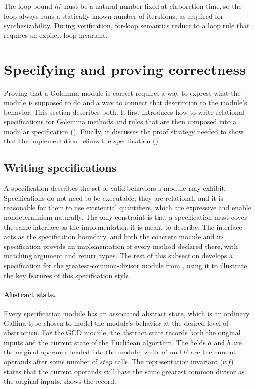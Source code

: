 \documentclass[fontset=fira-newtxsf]{mitthesis}
\theoremstyle{definition}
\theoremstyle{plain}
\begin{document}
The loop bound $\mathit{hi}$ must be a natural number fixed at elaboration time, so the loop always runs a statically known number of iterations, as required for synthesizability. During verification, for-loop semantics reduce to a loop rule that requires an explicit loop invariant.

\section{Specifying and proving correctness} \label{sec:Golemma-spec}

Proving that a Golemma module is correct requires a way to express what the module is supposed to do and a way to connect that description to the module's behavior.
This section describes both.
It first introduces how to write relational specifications for Golemma methods and rules that are then composed into a modular specification ().
Finally, it discusses the proof strategy needed to show that the implementation refines the specification ().

\subsection{Writing specifications} \label{sec:Golemma-spec-framework}

A specification describes the set of valid behaviors a module may exhibit.
Specifications do not need to be executable; they are relational, and it is reasonable for them to use existential quantifiers, which are expressive and enable nondeterminism naturally.
The only constraint is that a specification must cover the same interface as the implementation it is meant to describe. The interface acts as the specification boundary, and both the concrete module and its specification provide an implementation of every method declared there, with matching argument and return types.
The rest of this subsection develops a specification for the greatest-common-divisor module from , using it to illustrate the key features of this specification style.

\paragraph{Abstract state.}
Every specification module has an associated abstract state, which is an ordinary Gallina type chosen to model the module's behavior at the desired level of abstraction.
For the GCD module, the abstract state records both the original inputs and the current state of the Euclidean algorithm.
The fields $\mathit{a}$ and $\mathit{b}$ are the original operands loaded into the module, while $\mathit{a'}$ and $\mathit{b'}$ are the current operands after some number of $\mathit{step}$ calls.
The representation invariant ($\mathit{wf}$) states that the current operands still have the same greatest common divisor as the original inputs.
 shows the record.
\end{document}
